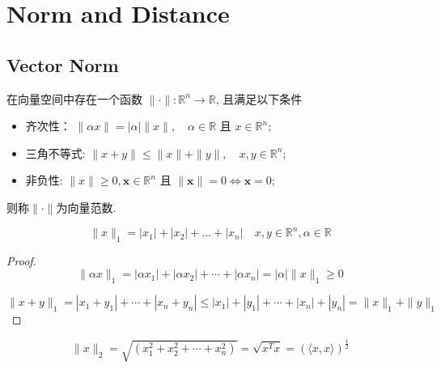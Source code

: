 \chapter{Norm and Distance}

\section{Vector Norm}

\begin{definition}
    在向量空间中存在一个函数 $ \|\cdot\|: \mathbb{R}^{n} \rightarrow \mathbb{R} $, 且满足以下条件

\begin{itemize}
    \item 齐次性： $ \|\alpha x\|=|\alpha|\|x\|, \quad \alpha \in \mathbb{R} $ 且 $ x \in \mathbb{R}^{n} $;
    \item 三角不等式: $ \|x+y\| \leq\|x\|+\|y\|, \quad x, y \in \mathbb{R}^{n} $;
    \item 非负性: $ \|x\| \geq {0}, \boldsymbol{x} \in \mathbb{R}^{n} $ 且 $ \|\boldsymbol{x}\|=0 \Leftrightarrow \boldsymbol{x}=0 $;
\end{itemize}
则称$\|\cdot\|$为向量范数. 
\end{definition}

\begin{example}
    $$ \|x\|_{1}=\left|x_{1}\right|+\left|x_{2}\right|+\ldots+\left|x_{n}\right| \quad x, y \in \mathbb{R}^{n}, \alpha \in \mathbb{R} $$
\end{example}

\begin{proof}
    $$ \|\alpha x\|_{1}=\left|\alpha x_{1}\right|+\left|\alpha x_{2}\right|+\cdots+\left|\alpha x_{n}\right|=|\alpha|\|x\|_{1} \geq 0 $$

    $$ \|x+y\|_{1}=\left|x_{1}+y_{1}\right|+\cdots+\left|x_{n}+y_{n}\right| \leq\left|x_{1}\right|+\left|y_{1}\right|+\cdots+\left|x_{n}\right|+\left|y_{n}\right|=\|x\|_{1}+\|y\|_{1} $$
\end{proof}

\begin{example}
    $$ \|x\|_{2}=\sqrt{\left(x_{1}^{2}+x_{2}^{2}+\cdots+x_{n}^{2}\right)}=\sqrt{x^{T} x}=(\langle x, x\rangle)^{\frac{1}{2}} $$
\end{example}

